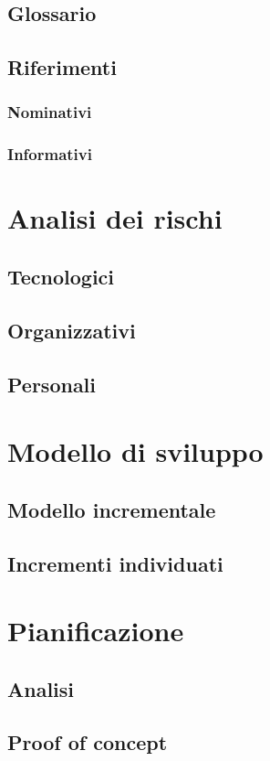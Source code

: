 \documentclass[a4paper, 11pt]{article}
\begin{document}
\subsection{Glossario}
\subsection{Riferimenti}
\subsubsection{Nominativi}
\subsubsection{Informativi}


\section{Analisi dei rischi}
\subsection{Tecnologici}
\subsection{Organizzativi}
\subsection{Personali}


\section{Modello di sviluppo}
\subsection{Modello incrementale}
\subsection{Incrementi individuati}


\section{Pianificazione}
\subsection{Analisi}
\subsection{Proof of concept}
\end{document}
